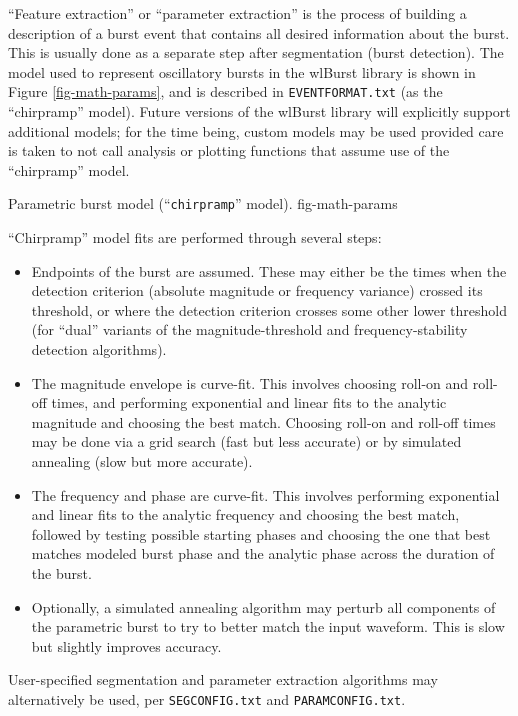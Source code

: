 ``Feature extraction'' or ``parameter extraction'' is the process of
building a description of a burst event that contains all desired information
about the burst. This is usually done as a separate step after segmentation
(burst detection). The model used to represent oscillatory bursts in the
wlBurst library is shown in Figure \ref{fig-math-params}, and is described
in \texttt{EVENTFORMAT.txt} (as the ``chirpramp'' model). Future versions
of the wlBurst library will explicitly support additional models; for the
time being, custom models may be used provided care is taken to not call
analysis or plotting functions that assume use of the ``chirpramp'' model.

{Parametric burst model (``\texttt{chirpramp}'' model).}
{fig-math-params}

``Chirpramp'' model fits are performed through several steps:

\begin{itemize}
%
\item Endpoints of the burst are assumed. These may either be the times
when the detection criterion (absolute magnitude or frequency variance)
crossed its threshold, or where the detection criterion crosses some other
lower threshold (for ``dual'' variants of the magnitude-threshold and
frequency-stability detection algorithms).
%
\item The magnitude envelope is curve-fit. This involves choosing roll-on
and roll-off times, and performing exponential and linear fits to the
analytic magnitude and choosing the best match. Choosing roll-on and roll-off
times may be done via a grid search (fast but less accurate) or by simulated
annealing (slow but more accurate).
%
\item The frequency and phase are curve-fit. This involves performing
exponential and linear fits to the analytic frequency and choosing the best
match, followed by testing possible starting phases and choosing the one that
best matches modeled burst phase and the analytic phase across the duration
of the burst.
%
\item Optionally, a simulated annealing algorithm may perturb all components
of the parametric burst to try to better match the input waveform. This is
slow but slightly improves accuracy.
%
\end{itemize}

User-specified segmentation and parameter extraction algorithms may
alternatively be used, per \linebreak
\texttt{SEGCONFIG.txt} and \texttt{PARAMCONFIG.txt}.


%
